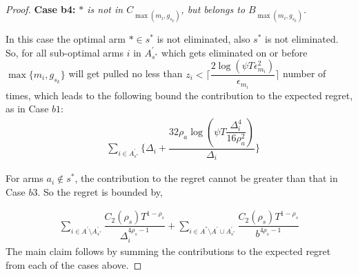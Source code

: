 \begin{proof}
\textbf{Case b4:} \textit{${*}$ is not in $C_{\max(m_{i},g_{s_{k}})}$, but belongs to $B_{\max(m_{i},g_{s_{k}})}$.}

In this case the optimal arm ${*}\in s^{*}$ is not eliminated, also $s^{*}$ is not eliminated. So, for all sub-optimal arms $i$ in $A_{s^*}^{'}$ which gets eliminated on or before $\max \lbrace m_{i},g_{s_{k}} \rbrace$ will get pulled no less than $z_i < \bigg\lceil\dfrac{2\log{(\psi T\epsilon_{m_{i}}^{2})}}{\epsilon_{m_{i}}}\bigg\rceil$ number of times, which leads to the following bound the contribution to the expected regret, as in Case $b1$:
\begin{align*}
 &\sum_{i\in A_{s^*}^{'}}\bigg\lbrace \Delta_{i}+\dfrac{32\rho_{a}\log{(\psi T\dfrac{\Delta_{i}^{4}}{16\rho_{a}^{2}})}}{\Delta_{i}} \bigg\rbrace 
\end{align*} 

For arms $a_i \notin s^*$, the contribution to the regret cannot be greater than that in Case $b3$. So the regret is bounded by,

\begin{align*}
\sum_{i\in A^{'}\setminus A_{s^*}^{'}}\dfrac{C_{2}(\rho_{s})T^{1-\rho_{s}}}{\Delta_{i}^{4\rho_{s}-1}} +\sum_{i\in A^{''}\setminus A^{'} \cup A_{s^*}^{'}}\dfrac{C_{2}(\rho_{s})T^{1-\rho_{s}}}{b^{4\rho_{s}-1}}
\end{align*}
The main claim follows by summing the contributions to the expected regret from each of the cases above.
\end{proof}
